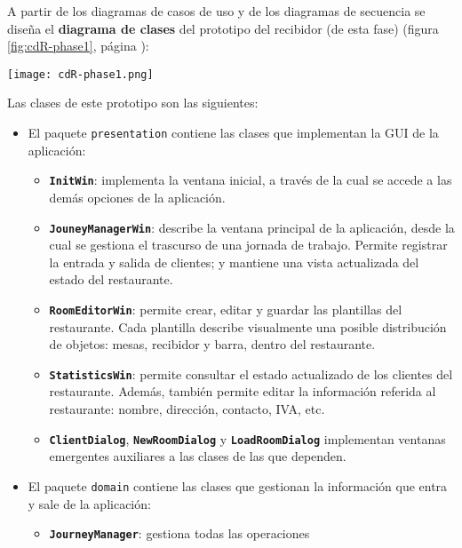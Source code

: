 A partir de los diagramas de casos de uso y de los diagramas de secuencia se
diseña el \textbf{diagrama de clases} del prototipo del recibidor (de esta
fase) (figura \ref{fig:cdR-phase1}, página \pageref{fig:cdR-phase1}):

  \begin{sidewaysfigure}[h]
    \begin{center}
      \texttt{[image: cdR-phase1.png]}
      \caption{Diagrama de clases del prototipo del recibidor (Fase 2).}
      \label{fig:cdR-phase1}
    \end{center}
  \end{sidewaysfigure}

Las clases de este prototipo son las siguientes:
\begin{itemize}
\item El paquete \texttt{presentation} contiene las clases que implementan
la \acs{GUI} de la aplicación:
  \begin{itemize}
  \item \textbf{\texttt{InitWin}}: implementa la ventana inicial, a través de 
  la cual se accede a las demás opciones de la aplicación.
  \item \textbf{\texttt{JouneyManagerWin}}: describe la ventana principal de la
  aplicación, desde la cual se gestiona el trascurso de una jornada de trabajo.
  Permite registrar la entrada y salida de clientes; y mantiene una vista
  actualizada del estado del restaurante.
  \item \textbf{\texttt{RoomEditorWin}}: permite crear, editar y guardar las
  plantillas del restaurante. Cada plantilla describe visualmente una posible
  distribución de objetos: mesas, recibidor y barra, dentro del restaurante.
  \item \textbf{\texttt{StatisticsWin}}: permite consultar el estado 
  actualizado de los clientes del restaurante. Además, también permite editar   
  la información referida al restaurante: nombre, dirección, contacto, IVA,
  etc.
  \item \textbf{\texttt{ClientDialog}}, \textbf{\texttt{NewRoomDialog}} y
  \textbf{\texttt{LoadRoomDialog}} implementan ventanas emergentes auxiliares a 
  las clases de las que dependen.
  \end{itemize}
\item El paquete \texttt{domain} contiene las clases que gestionan la 
información que entra y sale de la aplicación:
  \begin{itemize}
  \item \textbf{\texttt{JourneyManager}}: gestiona todas las operaciones 

\end{itemize}
\end{itemize}
